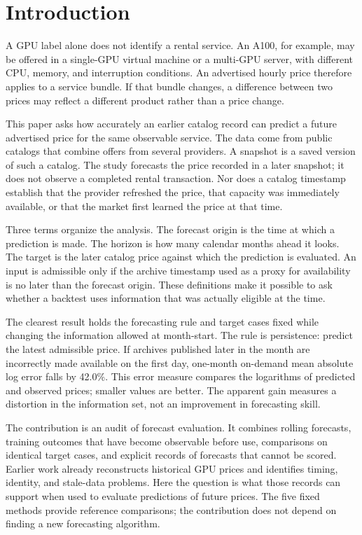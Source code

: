\documentclass[10pt]{article}
\begin{document}
\section{Introduction}

A GPU label alone does not identify a rental service. An A100, for example, may be offered in a single-GPU virtual machine or a multi-GPU server, with different CPU, memory, and interruption conditions. An advertised hourly price therefore applies to a service bundle. If that bundle changes, a difference between two prices may reflect a different product rather than a price change.

This paper asks how accurately an earlier catalog record can predict a future advertised price for the same observable service. The data come from public catalogs that combine offers from several providers. A snapshot is a saved version of such a catalog. The study forecasts the price recorded in a later snapshot; it does not observe a completed rental transaction. Nor does a catalog timestamp establish that the provider refreshed the price, that capacity was immediately available, or that the market first learned the price at that time.

Three terms organize the analysis. The forecast origin is the time at which a prediction is made. The horizon is how many calendar months ahead it looks. The target is the later catalog price against which the prediction is evaluated. An input is admissible only if the archive timestamp used as a proxy for availability is no later than the forecast origin. These definitions make it possible to ask whether a backtest uses information that was actually eligible at the time.

The clearest result holds the forecasting rule and target cases fixed while changing the information allowed at month-start. The rule is persistence: predict the latest admissible price. If archives published later in the month are incorrectly made available on the first day, one-month on-demand mean absolute log error falls by 42.0\%. This error measure compares the logarithms of predicted and observed prices; smaller values are better. The apparent gain measures a distortion in the information set, not an improvement in forecasting skill.

The contribution is an audit of forecast evaluation. It combines rolling forecasts, training outcomes that have become observable before use, comparisons on identical target cases, and explicit records of forecasts that cannot be scored. Earlier work already reconstructs historical GPU prices and identifies timing, identity, and stale-data problems. Here the question is what those records can support when used to evaluate predictions of future prices. The five fixed methods provide reference comparisons; the contribution does not depend on finding a new forecasting algorithm.
\end{document}
